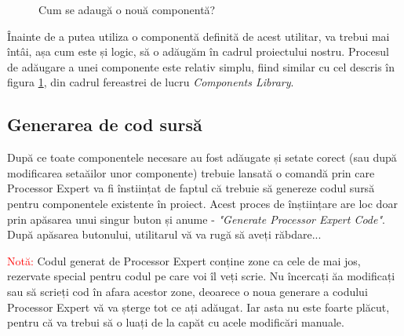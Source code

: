 \begin{figure}
    \vspace{-30pt}
    \vspace{-20pt}
    \caption{\label{fig:CodeWarrior-ProcessorExpertAdd} Cum se adaugă o nouă componentă?}
    \vspace{-10pt}
\end{figure}

Înainte de a putea utiliza o componentă definită de acest utilitar, va trebui mai întâi, așa cum este și logic, să o adăugăm în cadrul proiectului nostru. Procesul de adăugare a unei componente este relativ simplu, fiind similar cu cel descris în figura \ref{fig:CodeWarrior-ProcessorExpertAdd}, din cadrul fereastrei de lucru \textit{Components Library}.

\subsection{Generarea de cod sursă}

După ce toate componentele necesare au fost adăugate și setate corect (sau după modificarea setaăilor unor componente) trebuie lansată o comandă prin care Processor Expert va fi înstiințat de faptul că trebuie să genereze codul sursă pentru componentele existente în proiect. Acest proces de înștiințare are loc doar prin apăsarea unui singur buton și anume - \textit{"Generate Processor Expert Code"}. După apăsarea butonului, utilitarul vă va rugă să aveți răbdare...

\textcolor{red}{Notă:} Codul generat de Processor Expert conține zone ca cele de mai jos, rezervate special pentru codul pe care voi îl veți scrie. Nu încercați ăa modificați sau să scrieți cod în afara acestor zone, deoarece o noua generare a codului Processor Expert vă va șterge tot ce ați adăugat. Iar asta nu este foarte plăcut, pentru că va trebui să o luați de la capăt cu acele modificări manuale.

\newpage

